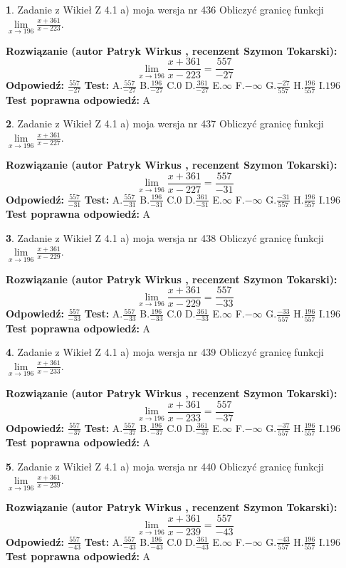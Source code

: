 \documentclass[12pt, a4paper]{article}
\theoremstyle{definition} %
\newtheorem{zad}{}
\newcommand{\zadStart}[1]{\begin{zad}#1\newline}
\newcommand{\zadStop}{\end{zad}}
\newcommand{\rozwStart}[2]{\noindent \textbf{Rozwiązanie (autor #1 , recenzent #2): }\newline}
\newcommand{\rozwStop}{\newline}
\newcommand{\odpStart}{\noindent \textbf{Odpowiedź:}\newline}
\newcommand{\odpStop}{\newline}
\newcommand{\testStart}{\noindent \textbf{Test:}\newline}
\newcommand{\testStop}{\newline}
\newcommand{\kluczStart}{\noindent \textbf{Test poprawna odpowiedź:}\newline}
\newcommand{\kluczStop}{\newline}
\begin{document}
\zadStart{Zadanie z Wikieł Z 4.1 a) moja wersja nr 436}
Obliczyć granicę funkcji $\lim\limits_{x\to196}\frac{x+361}{x-223}$.
\zadStop
\rozwStart{Patryk Wirkus}{Szymon Tokarski}
$$\lim\limits_{x\to196}\frac{x+361}{x-223} = \frac{557}{-27}$$
\rozwStop
\odpStart
$\frac{557}{-27}$
\odpStop
\testStart
A.$\frac{557}{-27}$
B.$\frac{196}{-27}$
C.$0$
D.$\frac{361}{-27}$
E.$\infty$
F.$-\infty$
G.$\frac{-27}{557}$
H.$\frac{196}{557}$
I.$196$
\testStop
\kluczStart
A
\kluczStop



\zadStart{Zadanie z Wikieł Z 4.1 a) moja wersja nr 437}
Obliczyć granicę funkcji $\lim\limits_{x\to196}\frac{x+361}{x-227}$.
\zadStop
\rozwStart{Patryk Wirkus}{Szymon Tokarski}
$$\lim\limits_{x\to196}\frac{x+361}{x-227} = \frac{557}{-31}$$
\rozwStop
\odpStart
$\frac{557}{-31}$
\odpStop
\testStart
A.$\frac{557}{-31}$
B.$\frac{196}{-31}$
C.$0$
D.$\frac{361}{-31}$
E.$\infty$
F.$-\infty$
G.$\frac{-31}{557}$
H.$\frac{196}{557}$
I.$196$
\testStop
\kluczStart
A
\kluczStop



\zadStart{Zadanie z Wikieł Z 4.1 a) moja wersja nr 438}
Obliczyć granicę funkcji $\lim\limits_{x\to196}\frac{x+361}{x-229}$.
\zadStop
\rozwStart{Patryk Wirkus}{Szymon Tokarski}
$$\lim\limits_{x\to196}\frac{x+361}{x-229} = \frac{557}{-33}$$
\rozwStop
\odpStart
$\frac{557}{-33}$
\odpStop
\testStart
A.$\frac{557}{-33}$
B.$\frac{196}{-33}$
C.$0$
D.$\frac{361}{-33}$
E.$\infty$
F.$-\infty$
G.$\frac{-33}{557}$
H.$\frac{196}{557}$
I.$196$
\testStop
\kluczStart
A
\kluczStop



\zadStart{Zadanie z Wikieł Z 4.1 a) moja wersja nr 439}
Obliczyć granicę funkcji $\lim\limits_{x\to196}\frac{x+361}{x-233}$.
\zadStop
\rozwStart{Patryk Wirkus}{Szymon Tokarski}
$$\lim\limits_{x\to196}\frac{x+361}{x-233} = \frac{557}{-37}$$
\rozwStop
\odpStart
$\frac{557}{-37}$
\odpStop
\testStart
A.$\frac{557}{-37}$
B.$\frac{196}{-37}$
C.$0$
D.$\frac{361}{-37}$
E.$\infty$
F.$-\infty$
G.$\frac{-37}{557}$
H.$\frac{196}{557}$
I.$196$
\testStop
\kluczStart
A
\kluczStop



\zadStart{Zadanie z Wikieł Z 4.1 a) moja wersja nr 440}
Obliczyć granicę funkcji $\lim\limits_{x\to196}\frac{x+361}{x-239}$.
\zadStop
\rozwStart{Patryk Wirkus}{Szymon Tokarski}
$$\lim\limits_{x\to196}\frac{x+361}{x-239} = \frac{557}{-43}$$
\rozwStop
\odpStart
$\frac{557}{-43}$
\odpStop
\testStart
A.$\frac{557}{-43}$
B.$\frac{196}{-43}$
C.$0$
D.$\frac{361}{-43}$
E.$\infty$
F.$-\infty$
G.$\frac{-43}{557}$
H.$\frac{196}{557}$
I.$196$
\testStop
\kluczStart
A
\kluczStop
\end{document}
